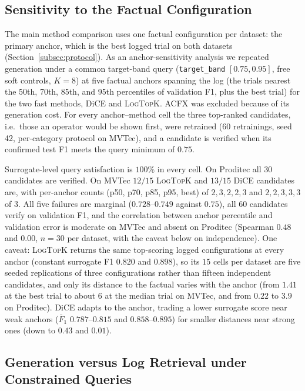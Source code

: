 \documentclass[final,5p,times,twocolumn]{elsarticle}
\begin{document}
\subsection{Sensitivity to the Factual Configuration}
\label{subsec:multi-factual}

The main method comparison uses one factual configuration per dataset:
the primary anchor, which is the best logged trial on both datasets
(Section~\ref{subsec:protocol}). As an anchor-sensitivity analysis we
repeated generation under a common target-band query
(\texttt{target\_band} $[0.75,0.95]$, free soft controls, $K=8$) at
five factual anchors spanning the log (the trials nearest the 50th,
70th, 85th, and 95th percentiles of validation F1, plus the best trial)
for the two fast methods, DiCE and \textsc{LogTopK}. ACFX was excluded
because of its generation cost. For every anchor--method cell the three
top-ranked candidates, i.e.\ those an operator would be shown first,
were retrained ($60$ retrainings, seed 42, per-category protocol on
MVTec), and a candidate is verified when its confirmed test F1 meets
the query minimum of $0.75$.

Surrogate-level query satisfaction is $100\%$ in every cell. On
Proditec all $30$ candidates are verified. On MVTec $12/15$
\textsc{LogTopK} and $13/15$ DiCE candidates are, with per-anchor
counts (p50, p70, p85, p95, best) of $2, 3, 2, 2, 3$ and $2, 2, 3, 3,
3$ of $3$. All five failures are marginal ($0.728$--$0.749$ against
$0.75$), all $60$ candidates verify on validation F1, and the correlation between anchor percentile and validation error is moderate on MVTec and absent on Proditec (Spearman $0.48$ and $0.00$, $n = 30$ per dataset, with the caveat below on independence). One caveat: \textsc{LogTopK} returns the same top-scoring
logged configurations at every anchor (constant surrogate F1 $0.820$
and $0.898$), so its $15$ cells per dataset are five seeded
replications of three configurations rather than fifteen independent
candidates, and only its distance to the factual varies with the anchor
(from $1.41$ at the best trial to about $6$ at the median trial on MVTec, and from $0.22$ to $3.9$ on Proditec). DiCE adapts to the anchor, trading a
lower surrogate score near weak anchors ($\bar{F}_1$ $0.787$--$0.815$
and $0.858$--$0.895$) for smaller distances near strong ones (down to
$0.43$ and $0.01$).

\subsection{Generation versus Log Retrieval under Constrained Queries}
\label{subsec:retrieval-comparison}
\end{document}
